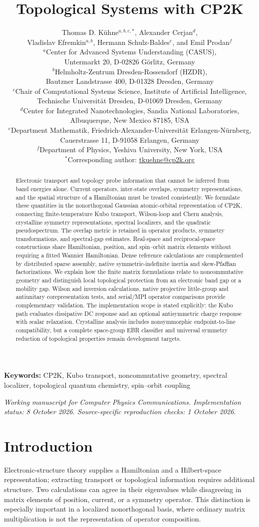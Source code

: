 \documentclass[11pt]{article}
\title{Topological Systems with CP2K}
\author{Thomas D. K\"uhne$^{a,b,c,*}$, Alexander Cerjan$^{d}$,\\
Vladislav Efremkin$^{a,b}$, Hermann Schulz-Baldes$^{e}$, and Emil Prodan$^{f}$\\[0.6em]
\small $^{a}$Center for Advanced Systems Understanding (CASUS),\\
\small Untermarkt 20, D-02826 G\"orlitz, Germany\\
\small $^{b}$Helmholtz-Zentrum Dresden-Rossendorf (HZDR),\\
\small Bautzner Landstrasse 400, D-01328 Dresden, Germany\\
\small $^{c}$Chair of Computational Systems Science, Institute of Artificial Intelligence,\\
\small Technische Universit\"at Dresden, D-01069 Dresden, Germany\\
\small $^{d}$Center for Integrated Nanotechnologies, Sandia National Laboratories,\\
\small Albuquerque, New Mexico 87185, USA\\
\small $^{e}$Department Mathematik, Friedrich-Alexander-Universit\"at Erlangen-N\"urnberg,\\
\small Cauerstrasse 11, D-91058 Erlangen, Germany\\
\small $^{f}$Department of Physics, Yeshiva University, New York, USA\\[0.4em]
\small $^{*}$Corresponding author: \href{mailto:tkuehne@cp2k.org}{tkuehne@cp2k.org}}
\date{}
\newcommand{\CPtwoK}{\textsc{CP2K}}
\numberwithin{equation}{section}
\begin{document}
\maketitle
\begin{abstract}
Electronic transport and topology probe information that cannot be
inferred from band energies alone. Current operators, inter-state
overlaps, symmetry representations, and the spatial structure of a
Hamiltonian must be treated consistently. We formulate these quantities
in the nonorthogonal Gaussian atomic-orbital representation of \CPtwoK,
connecting finite-temperature Kubo transport, Wilson-loop and Chern
analysis, crystalline symmetry representations, spectral localizers, and
the quadratic pseudospectrum. The overlap metric is retained in operator
products, symmetry transformations, and spectral-gap estimates.
Real-space and reciprocal-space constructions share Hamiltonian,
position, and spin--orbit matrix elements without requiring a fitted
Wannier Hamiltonian. Dense reference calculations are complemented by
distributed sparse assembly, native symmetric-indefinite inertia and
skew-Pfaffian factorizations. We explain how the finite
matrix formulations relate to noncommutative geometry and distinguish
local topological protection from an electronic band gap or a mobility
gap. Wilson and inversion calculations, native projective little-group
and antiunitary corepresentation tests, and serial/MPI operator
comparisons provide complementary validation.
The implementation scope is stated explicitly: the Kubo path evaluates
dissipative DC response and an optional antisymmetric charge response
with scalar relaxation. Crystalline analysis
includes nonsymmorphic endpoint-to-line compatibility, but a complete
space-group EBR classifier and universal symmetry reduction of
topological properties remain development targets.
\end{abstract}
\noindent\textbf{Keywords:} CP2K, Kubo transport, noncommutative geometry,
spectral localizer, topological quantum chemistry, spin--orbit coupling
\par\medskip
\noindent\textit{Working manuscript for Computer Physics Communications.
Implementation status: 8 October 2026.
Source-specific reproduction checks: 1 October 2026.}
\clearpage
\section{Introduction}
Electronic-structure theory supplies a Hamiltonian and a Hilbert-space
representation; extracting transport or topological information requires
additional structure. Two calculations can agree in their eigenvalues
while disagreeing in matrix elements of position, current, or a symmetry
operator. This distinction is especially important in a localized
nonorthogonal basis, where ordinary matrix multiplication is not the
representation of operator composition.
\end{document}
